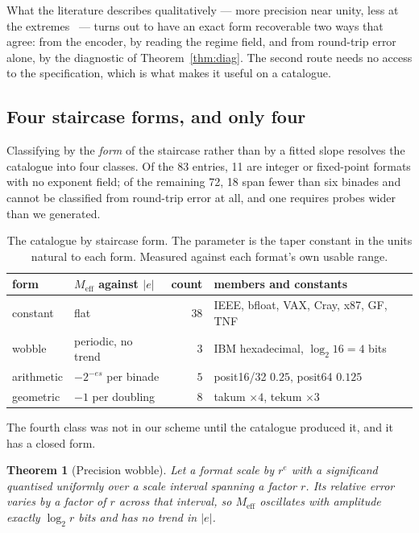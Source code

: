 \documentclass[11pt]{article}
\newtheorem{theorem}{Theorem}
\theoremstyle{definition}
\begin{document}
What the literature describes qualitatively --- more precision near unity, less
at the extremes~\cite{gustafson} --- turns out to have an exact form recoverable
two ways that agree: from the encoder, by reading the regime field, and from
round-trip error alone, by the diagnostic of Theorem~\ref{thm:diag}. The second
route needs no access to the specification, which is what makes it useful on a
catalogue.


\subsection{Four staircase forms, and only four}\label{sec:taxonomy}

Classifying by the \emph{form} of the staircase rather than by a fitted slope
resolves the catalogue into four classes. Of the 83 entries, 11 are integer or
fixed-point formats with no exponent field; of the remaining 72, 18 span fewer
than six binades and cannot be classified from round-trip error at all, and one
requires probes wider than we generated.

\begin{table}[t]\centering
\caption{The catalogue by staircase form. The parameter is the taper constant in
the units natural to each form. Measured against each format's own usable range.}
\label{tab:taxonomy}
\begin{tabular}{llrl}
\toprule
form & $M_{\mathrm{eff}}$ against $|e|$ & count & members and constants \\
\midrule
constant   & flat                          & $38$ & IEEE, bfloat, VAX, Cray, x87, GF, TNF \\
wobble     & periodic, no trend            & $3$  & IBM hexadecimal, $\log_2 16 = 4$ bits \\
arithmetic & $-2^{-es}$ per binade         & $5$  & posit16/32 $0.25$, posit64 $0.125$ \\
geometric  & $-1$ per doubling             & $8$  & takum $\times 4$, tekum $\times 3$ \\
\bottomrule
\end{tabular}
\end{table}

The fourth class was not in our scheme until the catalogue produced it, and it has
a closed form.

\begin{theorem}[Precision wobble]
\label{thm:wobble}
Let a format scale by $r^{e}$ with a significand quantised uniformly over a
scale interval spanning a factor $r$. Its relative error varies by a factor of
$r$ across that interval, so $M_{\mathrm{eff}}$ oscillates with amplitude exactly
$\log_2 r$ bits and has no trend in $|e|$.
\end{theorem}
\end{document}
